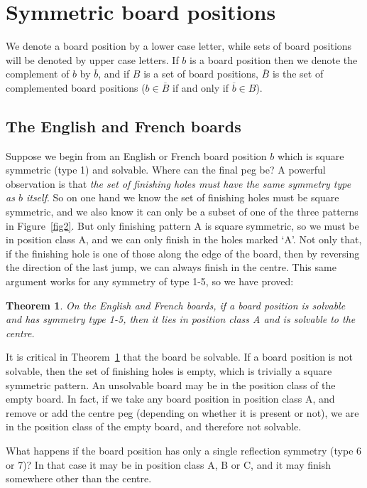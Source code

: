 \documentclass[12pt,reqno]{article}
\newtheorem{theorem}{Theorem}
\begin{document}
\section{Symmetric board positions}
\label{sec:symmetry}

We denote a board position by a lower case letter,
while sets of board positions will be denoted by upper case letters.
If $b$ is a board position then we denote the complement of $b$ by $\overline{b}$,
and if $B$ is a set of board positions,
$\overline{B}$ is the set of complemented board positions
($b\in \overline{B}$ if and only if $\overline{b}\in B$).

\subsection{The English and French boards}
\label{sec:symEngFr}

Suppose we begin from an English or French board position $b$ which is
square symmetric (type 1) and solvable.
Where can the final peg be?
A powerful observation is that
{\it the set of finishing holes must have the same symmetry type as $b$ itself}.
So on one hand we know the set of finishing holes must be square symmetric,
and we also know it can only be a subset of one of the three patterns in Figure~\ref{fig2}.
But only finishing pattern A is square symmetric, so we must be in position class A,
and we can only finish in the holes marked `A'.
Not only that, if the finishing hole is one of those along the edge of the board,
then by reversing the direction of the last jump, we can always finish in the centre.
This same argument works for any symmetry of type 1-5, so we have proved:

\begin{theorem}
On the English and French boards,
if a board position is solvable and has symmetry type 1-5, 
then it lies in position class A and is solvable to the centre.
\label{th1}
\end{theorem}

It is critical in Theorem~\ref{th1} that the board be solvable.
If a board position is not solvable, then the set of finishing holes is empty,
which is trivially a square symmetric pattern.
An unsolvable board may be in the position class of the empty board.
In fact, if we take any board position in position class A,
and remove or add the centre peg (depending on whether it is present or not),
we are in the position class of the empty board,
and therefore not solvable.

What happens if the board position has only a single reflection symmetry (type 6 or 7)?
In that case it may be in position class A, B or C, and it may finish somewhere other than the centre.
\end{document}
